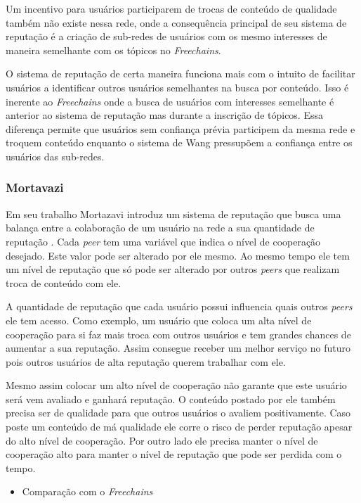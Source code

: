 \documentclass[12pt]{article}
\newcommand{\FC} {\textit{Freechains}\xspace}
\begin{document}
Um incentivo para usuários participarem de trocas de conteúdo de qualidade também não existe nessa rede, onde a consequência principal de seu sistema de reputação é a criação de sub-redes de usuários com os mesmo interesses de maneira semelhante com os tópicos no \FC.

O sistema de reputação de certa maneira funciona mais com o intuito de facilitar usuários a identificar outros usuários semelhantes na busca por conteúdo.
Isso é inerente ao \FC onde a busca de usuários com interesses semelhante é anterior ao sistema de reputação mas durante a inscrição de tópicos.
Essa diferença permite que usuários sem confiança prévia participem da mesma rede e troquem conteúdo enquanto o sistema de Wang pressupõem a confiança entre os usuários das sub-redes.

\subsubsection{Mortavazi} \label{subsub:mortavazi}

Em seu trabalho Mortazavi introduz um sistema de reputação que busca uma balança entre a colaboração de um usuário na rede a sua quantidade de reputação \cite{mortazavi2006cumulative}. 
Cada \textit{peer} tem uma variável que indica o nível de cooperação desejado. 
Este valor pode ser alterado por ele mesmo. 
Ao mesmo tempo ele tem um nível de reputação que só pode ser alterado por outros \textit{peers} que realizam troca de conteúdo com ele.

A quantidade de reputação que cada usuário possui influencia quais outros \textit{peers} ele tem acesso. 
Como exemplo, um usuário que coloca um alta nível de cooperação para si faz mais troca com outros usuários e tem grandes chances de aumentar a sua reputação. 
Assim consegue receber um melhor serviço no futuro pois outros usuários de alta reputação querem trabalhar com ele.

Mesmo assim colocar um alto nível de cooperação não garante que este usuário será vem avaliado e ganhará reputação.
O conteúdo postado por ele também precisa ser de qualidade para que outros usuários o avaliem positivamente.
Caso poste um conteúdo de má qualidade ele corre o risco de perder reputação apesar do alto nível de cooperação.
Por outro lado ele precisa manter o nível de cooperação alto para manter o nível de reputação que pode ser perdida com o tempo.

\begin{itemize}
    \item Comparação com o \FC
\end{itemize}
\end{document}
